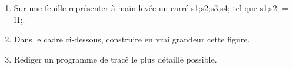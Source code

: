 \documentclass[exercice]{thedocument}%
\begin{document}
%
\begin{enumerate}
    \item Sur une feuille représenter à main levée un carré
    \<s1;\<s2;\<s3;\<s4; tel que \<s1;\<s2; = \<l1;.
    \item Dans le cadre ci-dessous, construire en vrai grandeur cette figure.
    \item Rédiger un programme de tracé le plus détaillé possible.
\end{enumerate}
\begin{mdframed}
    \vspace{7cm}
\end{mdframed}
\end{document}
